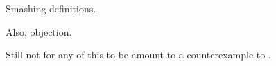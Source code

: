 \begin{note}
  Smashing definitions.
\end{note}

\begin{note}
  Also, objection.
\end{note}

\begin{note}
  Still not  for any of this to be amount to a counterexample to \issueConstraint{}.
\end{note}















